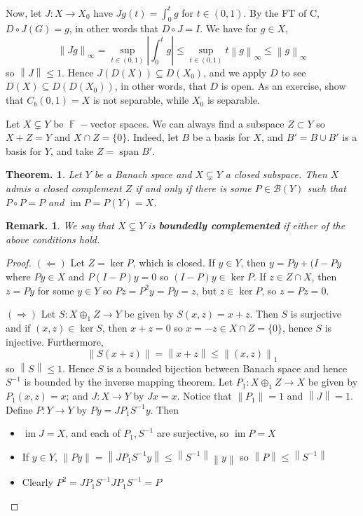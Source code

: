 \documentclass[11pt, a4paper]{memoir}
\DeclareMathOperator{\F}{{\mathbb{F}}}
\newcommand{\norm}[1]{\ensuremath{\left\lVert#1\right\rVert}}
\theoremstyle{change}
\newtheorem{theorem}{Theorem.}[section]
\theoremstyle{plain}
\theoremstyle{nonumberplain}
\newtheorem{remark}{Remark.}
\newtheorem{proof}{Proof}
\DeclareMathOperator{\im}{im}
\DeclareMathOperator{\spn}{span}
\numberwithin{equation}{section}
\begin{document}
\begin{enumerate}[nl,r]
        Now, let $J:X\to X_0$ have $Jg(t)=\int_0^t g$ for $t\in(0,1)$.
        By the FT of C, $D\circ J(G)=g$, in other words that $D\circ J=I$.
        We have for $g\in X$,
        \begin{equation*}
            \norm{Jg}_\infty=\sup_{t\in(0,1)}|\int_0^tg|\leq\sup_{t\in(0,1)}t\norm{g}_\infty\leq\norm{g}_\infty
        \end{equation*}
        so $\norm{J}\leq 1$.
        Hence $J(D(X))\subseteq D(X_0)$, and we apply $D$ to see $D(X)\subseteq D(D(X_0))$, in other words, that $D$ is open.
        As an exercise, show that $C_b(0,1)=X$ is not separable, while $X_0$ is separable.
\end{enumerate}
Let $X\subsetneq Y$ be $\F-$vector spaces.
We can always find a subspace $Z\subset Y$ so $X+Z=Y$ and $X\cap Z=\{0\}$.
Indeed, let $B$ be a basis for $X$, and $B'=B\cup B'$ is a basis for $Y$, and take $Z=\spn B'$.
\begin{theorem}
    Let $Y$ be a Banach space and $X\subsetneq Y$ a closed subspace.
    Then $X$ admis a closed complement $Z$ if and only if there is some $P\in\mathcal{B}(Y)$ such that $P\circ P=P$ and $\im P=P(Y)=X$.
\end{theorem}
\begin{remark}
    We say that $X\subsetneq Y$ is \textbf{boundedly complemented} if either of the above conditions hold.
\end{remark}
\begin{proof}
    $(\Leftarrow)$ Let $Z=\ker P$, which is closed.
    If $y\in Y$, then $y=Py+(I-Py$ where $Py\in X$ and $P(I-P)y=0$ so $(I-P)y\in\ker P$.
    If $z\in Z\cap X$, then $z=Py$ for some $y\in Y$ so $Pz=P^2y=Py=z$, but $z\in\ker P$, so $z=Pz=0$.

    $(\Rightarrow)$ Let $S:X\oplus_1 Z\to Y$ be given by $S(x,z)=x+z$.
    Then $S$ is surjective and if $(x,z)\in\ker S$, then $x+z=0$ so $x=-z\in X\cap Z=\{0\}$, hence $S$ is injective.
    Furthermore,
    \begin{equation*}
        \norm{S(x+z)}=\norm{x+z}\leq\norm{(x,z)}_1
    \end{equation*}
    so $\norm{S}\leq 1$.
    Hence $S$ is a bounded bijection between Banach space and hence $S^{-1}$ is bounded by the inverse mapping theorem.
    Let $P_1:X\oplus_1 Z\to X$ be given by $P_1(x,z)=x$; and $J:X\to Y$ by $Jx=x$.
    Notice that $\norm{P_1}=1$ and $\norm{J}=1$.
    Define $P:Y\to Y$ by $Py=JP_1S^{-1}y$.
    Then
    \begin{itemize}[nl]
        \item $\im J=X$, and each of $P_1,S^{-1}$ are surjective, so $\im P=X$
        \item If $y\in Y$, $\norm{Py}=\norm{JP_1S^{-1}y}\leq\norm{S^{-1}}\norm{y}$ so $\norm{P}\leq\norm{S^{-1}}$
        \item Clearly $P^2=JP_1S^{-1}JP_1S^{-1}=P$
    \end{itemize}
\end{proof}
\end{document}
